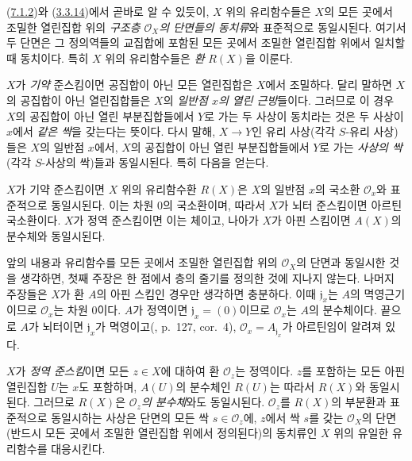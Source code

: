 \begin{env}[7.1.3]
\label{I.7.1.3-ko}
(\hyperref[I.7.1.2-ko]{7.1.2})와
(\hyperref[I.3.3.14-ko]{3.3.14})에서 곧바로 알 수 있듯이,
$X$ 위의 유리함수들은 $X$의 모든 곳에서 조밀한 열린집합 위의
\emph{구조층 $\mathscr{O}_X$의 단면들의 동치류}와 표준적으로
동일시된다. 여기서 두 단면은 그 정의역들의 교집합에 포함된 모든
곳에서 조밀한 열린집합 위에서 일치할 때 동치이다. 특히 $X$ 위의
유리함수들은 \emph{환} $R(X)$을 이룬다.
\end{env}

\begin{env}[7.1.4]
\label{I.7.1.4-ko}
$X$가 \emph{기약} 준스킴이면 공집합이 아닌 모든 열린집합은 $X$에서
조밀하다. 달리 말하면 $X$의 공집합이 아닌 열린집합들은 $X$의
\emph{일반점 $x$의 열린 근방}들이다. 그러므로 이 경우 $X$의 공집합이
아닌 열린 부분집합들에서 $Y$로 가는 두 사상이 동치라는 것은 두
사상이 $x$에서 \emph{같은 싹}을 갖는다는 뜻이다. 다시 말해,
$X\to Y$인 유리 사상(각각 $S$-유리 사상)들은 $X$의 일반점
$x$에서, $X$의 공집합이 아닌 열린 부분집합들에서 $Y$로 가는
\emph{사상의 싹}(각각 $S$-사상의 싹)들과 동일시된다. 특히 다음을
얻는다.
\end{env}

\begin{proposition}[7.1.5]
\label{I.7.1.5-ko}
$X$가 기약 준스킴이면 $X$ 위의 유리함수환 $R(X)$은 $X$의 일반점
$x$의 국소환 $\mathscr{O}_x$와 표준적으로 동일시된다. 이는 차원
0의 국소환이며, 따라서 $X$가 뇌터 준스킴이면 아르틴 국소환이다.
$X$가 정역 준스킴이면 이는 체이고, 나아가 $X$가 아핀 스킴이면 $A(X)$의
분수체와 동일시된다.
\end{proposition}

앞의 내용과 유리함수를 모든 곳에서 조밀한 열린집합 위의
$\mathscr{O}_X$의 단면과 동일시한 것을 생각하면, 첫째 주장은 한
점에서 층의 줄기를 정의한 것에 지나지 않는다. 나머지 주장들은
$X$가 환 $A$의 아핀 스킴인 경우만 생각하면 충분하다. 이때
$\mathfrak{j}_x$는 $A$의 멱영근기이므로 $\mathscr{O}_x$는 차원
0이다. $A$가 정역이면 $\mathfrak{j}_x=(0)$이므로 $\mathscr{O}_x$는
$A$의 분수체이다. 끝으로 $A$가 뇌터이면 $\mathfrak{j}_x$가
멱영이고(\cite{I-11}, p.~127, cor.~4),
$\mathscr{O}_x=A_{\mathfrak{j}_x}$가 아르틴임이 알려져 있다.

$X$가 \emph{정역 준스킴}이면 모든 $z\in X$에 대하여 환 $\mathscr{O}_z$는
정역이다. $z$를 포함하는 모든 아핀 열린집합 $U$는 $x$도 포함하며,
$A(U)$의 분수체인 $R(U)$는 따라서 $R(X)$와 동일시된다.
그러므로 $R(X)$은 \emph{$\mathscr{O}_z$의 분수체}와도 동일시된다.
$\mathscr{O}_z$를 $R(X)$의 부분환과 표준적으로 동일시하는 사상은
단면의 모든 싹 $s\in\mathscr{O}_z$에, $z$에서 싹 $s$를 갖는
$\mathscr{O}_X$의 단면(반드시 모든 곳에서 조밀한 열린집합 위에서
정의된다)의 동치류인 $X$ 위의 유일한 유리함수를 대응시킨다.

